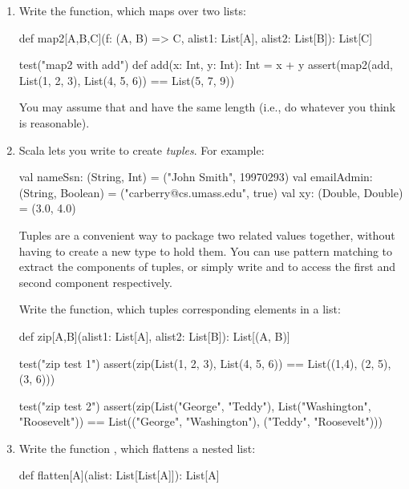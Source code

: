 \begin{enumerate}

\item
Write the  function, which maps over two lists:

\begin{scalacode}
def map2[A,B,C](f: (A, B) => C, alist1: List[A], alist2: List[B]): List[C]

test("map2 with add") {
  def add(x: Int, y: Int): Int = x + y
  assert(map2(add, List(1, 2, 3), List(4, 5, 6)) == List(5, 7, 9))
}
\end{scalacode}

You may assume that  and  have the same
length (i.e., do whatever you think is reasonable).

\item
Scala lets you write  to create \emph{tuples}. For example:

\begin{scalacode}
val nameSsn: (String, Int) = ("John Smith", 19970293)
val emailAdmin: (String, Boolean) = ("carberry@cs.umass.edu", true)
val xy: (Double, Double) = (3.0, 4.0)
\end{scalacode}

Tuples are a convenient way to package two related values together, without
having to create a new type to hold them. You can use pattern matching to
extract the components of tuples, or simply write 
and  to access the first and second component respectively.

Write the  function, which tuples corresponding elements in a list:

\begin{scalacode}
def zip[A,B](alist1: List[A], alist2: List[B]): List[(A, B)]

test("zip test 1") {
  assert(zip(List(1, 2, 3), List(4, 5, 6)) == List((1,4), (2, 5), (3, 6)))
}

test("zip test 2") {
  assert(zip(List("George", "Teddy"), List("Washington", "Roosevelt")) ==
         List(("George", "Washington"), ("Teddy", "Roosevelt")))
}
\end{scalacode}

\item
Write the function , which flattens a nested list:

\begin{scalacode}
def flatten[A](alist: List[List[A]]): List[A]


\end{scalacode}
\end{enumerate}
